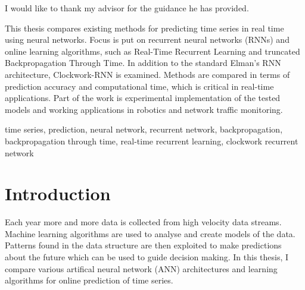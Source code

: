 \documentclass[12pt,oneside]{fithesis2}
\begin{document}
  \FrontMatter                    %
    \ThesisTitlePage                %
    \begin{ThesisDeclaration}       %
      \DeclarationText
      \AdvisorName
    \end{ThesisDeclaration}
    \begin{ThesisThanks}            %
      I would like to thank my advisor for the guidance he has provided. %
    \end{ThesisThanks}
    \begin{ThesisAbstract}          %
      This thesis compares existing methods for predicting time series in real time using neural networks. Focus is put on recurrent neural networks (RNNs) and online learning algorithms, such as Real-Time Recurrent Learning and truncated Backpropagation Through Time. In addition to the standard Elman's RNN architecture, \mbox{Clockwork-RNN} is examined. Methods are compared in terms of prediction accuracy and computational time, which is critical in real-time applications. Part of the work is experimental implementation of the tested models and working applications in robotics and  network traffic monitoring.
    \end{ThesisAbstract}
    \begin{ThesisKeyWords}          %
	time series, prediction, neural network, recurrent network, backpropagation, backpropagation through time, real-time recurrent learning, clockwork recurrent network
    \end{ThesisKeyWords}
    \tableofcontents                %
   \listoftables                   %
   \listoffigures                  %
   
  
  \MainMatter
    \chapter{Introduction} %
Each year more and more data is collected from high velocity data streams. Machine learning algorithms are used to analyse and create models of the data. Patterns found in the data structure are then exploited to make predictions about the future which can be used to guide decision making. In this thesis, I compare various artifical neural network (ANN) architectures and learning algorithms for online prediction of time series.
\end{document}
